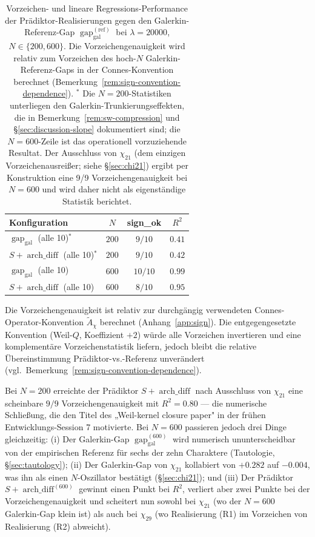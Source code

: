 \documentclass[a4paper,10pt,twocolumn]{article}
\theoremstyle{definition}
\theoremstyle{remark}
\newcommand{\gap}{\operatorname{gap}}
\newcommand{\chifn}{\chi}
\newcommand{\archdiff}{\operatorname{arch\_diff}}
\begin{document}
\begin{table}[t]
\caption{Vorzeichen- und lineare Regressions-Performance der
  Prädiktor-Realisierungen gegen den Galerkin-Referenz-Gap
  $\gap_{\mathrm{gal}}^{(\mathrm{ref})}$ bei $\lambda=20000$,
  $N\in\{200,600\}$. Die Vorzeichengenauigkeit wird relativ zum
  Vorzeichen des hoch-$N$ Galerkin-Referenz-Gaps in der
  Connes-Konvention berechnet (Bemerkung~\ref{rem:sign-convention-dependence}).
  $^*$ Die $N=200$-Statistiken unterliegen den
  Galerkin-Trunkierungseffekten, die in
  Bemerkung~\ref{rem:sw-compression} und
  \S\ref{sec:discussion-slope} dokumentiert sind; die $N=600$-Zeile ist
  das operationell vorzuziehende Resultat.
  Der Ausschluss von $\chifn_{21}$ (dem einzigen Vorzeichenausreißer;
  siehe \S\ref{sec:chi21}) ergibt per Konstruktion eine 9/9
  Vorzeichengenauigkeit bei $N=600$ und wird daher nicht als
  eigenständige Statistik berichtet.}
\label{tab:regression}
\centering
\small
\begin{tabular}{@{}lccc@{}}
\toprule
Konfiguration & $N$ & sign\_ok & $R^2$ \\
\midrule
$\gap_{\mathrm{gal}}$ (alle 10)$^*$ & $200$ & $9/10$ & $0.41$ \\
$S+\archdiff$ (alle 10)$^*$ & $200$ & $9/10$ & $0.42$ \\
\midrule
$\gap_{\mathrm{gal}}$ (alle 10) & $600$ & $10/10$ & $0.99$ \\
$S+\archdiff$ (alle 10) & $600$ & $8/10$ & $0.95$ \\
\bottomrule
\end{tabular}

\smallskip
\footnotesize
Die Vorzeichengenauigkeit ist relativ zur durchgängig verwendeten
Connes-Operator-Konvention $\tilde{A}_\chi$ berechnet
(Anhang~\ref{app:sign}). Die entgegengesetzte Konvention
(Weil-$Q$, Koeffizient $+2$) würde alle Vorzeichen invertieren und
eine komplementäre Vorzeichenstatistik liefern, jedoch bleibt die
relative Übereinstimmung Prädiktor-vs.-Referenz unverändert
(vgl.\ Bemerkung~\ref{rem:sign-convention-dependence}).
\end{table}

Bei $N=200$ erreichte der Prädiktor $S+\archdiff$ nach Ausschluss von
$\chifn_{21}$ eine scheinbare $9/9$ Vorzeichengenauigkeit mit $R^2=0.80$
--- die numerische Schließung, die den Titel des „Weil-kernel closure
paper" in der frühen Entwicklungs-Session 7 motivierte. Bei $N=600$
passieren jedoch drei Dinge gleichzeitig:
(i) Der Galerkin-Gap $\gap_{\mathrm{gal}}^{(600)}$ wird
numerisch ununterscheidbar von der empirischen Referenz für sechs
der zehn Charaktere (Tautologie, \S\ref{sec:tautology});
(ii) Der Galerkin-Gap von $\chifn_{21}$ kollabiert von $+0.282$ auf
$-0.004$, was ihn als einen $N$-Oszillator bestätigt
(\S\ref{sec:chi21}); und
(iii) Der Prädiktor $S+\archdiff^{(600)}$ gewinnt einen Punkt bei
$R^2$, verliert aber zwei Punkte bei der Vorzeichengenauigkeit und scheitert nun
sowohl bei $\chifn_{21}$ (wo der $N=600$ Galerkin-Gap klein ist) als auch bei
$\chifn_{29}$ (wo Realisierung (R1) im Vorzeichen von
Realisierung (R2) abweicht).
\end{document}
